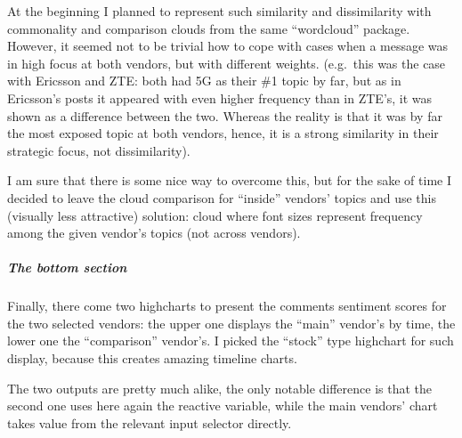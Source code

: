 \documentclass[]{article}
\newenvironment{Shaded}{\begin{snugshade}}{\end{snugshade}}
\newcommand{\NormalTok}[1]{{#1}}
\let\oldsubparagraph\subparagraph
\renewcommand{\subparagraph}[1]{\oldsubparagraph{#1}\mbox{}}
\begin{document}
\begin{Shaded}
\begin{Highlighting}[]
{{{{{{  \NormalTok{\})}
\end{Highlighting}
\end{Shaded}

At the beginning I planned to represent such similarity and
dissimilarity with commonality and comparison clouds from the same
``wordcloud'' package. However, it seemed not to be trivial how to cope
with cases when a message was in high focus at both vendors, but with
different weights. (e.g.~this was the case with Ericsson and ZTE: both
had 5G as their \#1 topic by far, but as in Ericsson's posts it appeared
with even higher frequency than in ZTE's, it was shown as a difference
between the two. Whereas the reality is that it was by far the most
exposed topic at both vendors, hence, it is a strong similarity in their
strategic focus, not dissimilarity).

I am sure that there is some nice way to overcome this, but for the sake
of time I decided to leave the cloud comparison for ``inside'' vendors'
topics and use this (visually less attractive) solution: cloud where
font sizes represent frequency among the given vendor's topics (not
across vendors).

\subparagraph{The bottom section}\label{the-bottom-section}

Finally, there come two highcharts to present the comments sentiment
scores for the two selected vendors: the upper one displays the ``main''
vendor's by time, the lower one the ``comparison'' vendor's. I picked
the ``stock'' type highchart for such display, because this creates
amazing timeline charts.

The two outputs are pretty much alike, the only notable difference is
that the second one uses here again the reactive variable, while the
main vendors' chart takes value from the relevant input selector
directly.
\end{document}
